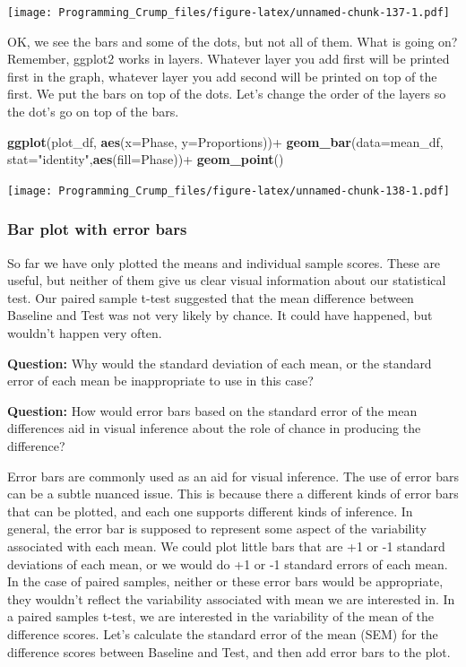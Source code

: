 \documentclass[]{book}
\newenvironment{Shaded}{\begin{snugshade}}{\end{snugshade}}
\newcommand{\KeywordTok}[1]{\textcolor[rgb]{0.13,0.29,0.53}{\textbf{{#1}}}}
\newcommand{\DataTypeTok}[1]{\textcolor[rgb]{0.13,0.29,0.53}{{#1}}}
\newcommand{\StringTok}[1]{\textcolor[rgb]{0.31,0.60,0.02}{{#1}}}
\newcommand{\NormalTok}[1]{{#1}}
\theoremstyle{definition}
\theoremstyle{definition}
\theoremstyle{definition}
\theoremstyle{remark}
\begin{document}
\texttt{[image: Programming\_Crump\_files/figure-latex/unnamed-chunk-137-1.pdf]}

OK, we see the bars and some of the dots, but not all of them. What is
going on? Remember, ggplot2 works in layers. Whatever layer you add
first will be printed first in the graph, whatever layer you add second
will be printed on top of the first. We put the bars on top of the dots.
Let's change the order of the layers so the dot's go on top of the bars.

\begin{Shaded}
\begin{Highlighting}[]
\KeywordTok{ggplot}\NormalTok{(plot_df, }\KeywordTok{aes}\NormalTok{(}\DataTypeTok{x=}\NormalTok{Phase, }\DataTypeTok{y=}\NormalTok{Proportions))+}\StringTok{ }
\StringTok{  }\KeywordTok{geom_bar}\NormalTok{(}\DataTypeTok{data=}\NormalTok{mean_df, }\DataTypeTok{stat=}\StringTok{"identity"}\NormalTok{,}\KeywordTok{aes}\NormalTok{(}\DataTypeTok{fill=}\NormalTok{Phase))+}
\StringTok{  }\KeywordTok{geom_point}\NormalTok{()}
\end{Highlighting}
\end{Shaded}

\texttt{[image: Programming\_Crump\_files/figure-latex/unnamed-chunk-138-1.pdf]}

\subsubsection{Bar plot with error bars}\label{bar-plot-with-error-bars}

So far we have only plotted the means and individual sample scores.
These are useful, but neither of them give us clear visual information
about our statistical test. Our paired sample t-test suggested that the
mean difference between Baseline and Test was not very likely by chance.
It could have happened, but wouldn't happen very often.

\textbf{Question:} Why would the standard deviation of each mean, or the
standard error of each mean be inappropriate to use in this case?

\textbf{Question:} How would error bars based on the standard error of
the mean differences aid in visual inference about the role of chance in
producing the difference?

Error bars are commonly used as an aid for visual inference. The use of
error bars can be a subtle nuanced issue. This is because there a
different kinds of error bars that can be plotted, and each one supports
different kinds of inference. In general, the error bar is supposed to
represent some aspect of the variability associated with each mean. We
could plot little bars that are +1 or -1 standard deviations of each
mean, or we would do +1 or -1 standard errors of each mean. In the case
of paired samples, neither or these error bars would be appropriate,
they wouldn't reflect the variability associated with mean we are
interested in. In a paired samples t-test, we are interested in the
variability of the mean of the difference scores. Let's calculate the
standard error of the mean (SEM) for the difference scores between
Baseline and Test, and then add error bars to the plot.
\end{document}
